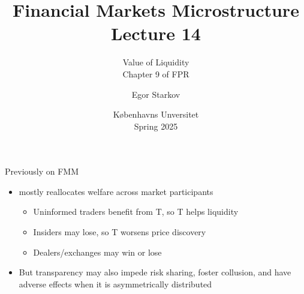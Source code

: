 \documentclass[english,10pt
,aspectratio=169
]{beamer}
\title{Financial Markets Microstructure \\ Lecture 14}
\subtitle{Value of Liquidity\\
	Chapter 9 of FPR}
\author{Egor Starkov}
\date{K{\o}benhavns Unversitet \\
	Spring 2025}
\begin{document}
\frame[plain]{\titlepage}


\begin{frame}{Previously on FMM}
	\begin{itemize}
		\item {} mostly reallocates welfare across market participants 
		\begin{itemize}
			\item Uninformed traders benefit from T, so T {helps liquidity}
			\item Insiders may lose, so T {worsens price discovery}
			\item Dealers/exchanges may win or lose
		\end{itemize}
		\item But transparency may also impede risk sharing, foster collusion, and have adverse effects when it is asymmetrically distributed
	\end{itemize}
\end{frame}
\end{document}
